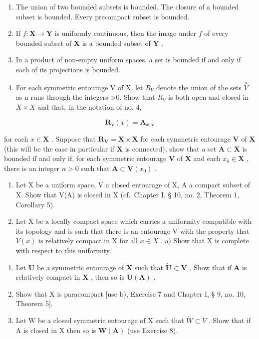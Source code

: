 \begin{enumerate}
\def\labelenumi{\alph{enumi})}
\item
  The union of two bounded subsets is bounded. The closure of a bounded subset is bounded. Every precompact subset is bounded.
\item
  If \(f: \mathbf{X} \to \mathbf{Y}\) is uniformly continuous, then the image under \(f\) of every bounded subset of \(\mathbf{X}\) is a bounded subset of \(\mathbf{Y}\) .
\item
  In a product of non-empty uniform spaces, a set is bounded if and only if each of its projections is bounded.
\item
  For each symmetric entourage V of X, let \(R_{V}\) denote the union of the sets \(\stackrel{n}{V}\) as n runs through the integers \textgreater0. Show that \(R_{V}\) is both open and closed in \(X \times X\) and that, in the notation of no. 4,
\end{enumerate}

\[
\mathbf {R} _ {\mathbf {v}} (x) = \mathbf {A} _ {x, \mathbf {v}}
\]

for each \(x \in \mathbf{X}\) . Suppose that \(\mathbf{R}_{\mathbf{V}} = \mathbf{X} \times \mathbf{X}\) for each symmetric entourage \(\mathbf{V}\) of \(\mathbf{X}\) (this will be the case in particular if \(\mathbf{X}\) is connected); show that a set \(\mathbf{A} \subset \mathbf{X}\) is bounded if and only if, for each symmetric entourage \(\mathbf{V}\) of \(\mathbf{X}\) and each \(x_0 \in \mathbf{X}\) , there is an integer \(n > 0\) such that \(\mathbf{A} \subset \mathbf{V}(x_0)\) .

\begin{enumerate}
\def\labelenumi{\arabic{enumi})}
\setcounter{enumi}{7}
\item
  Let X be a uniform space, V a closed entourage of X, A a compact subset of X. Show that V(A) is closed in X (cf.~Chapter I, § 10, no. 2, Theorem 1, Corollary 5).
\item
  Let X be a locally compact space which carries a uniformity compatible with its topology and is such that there is an entourage V with the property that \(V(x)\) is relatively compact in X for all \(x \in X\) . a) Show that X is complete with respect to this uniformity.
\end{enumerate}

\begin{enumerate}
\def\labelenumi{\alph{enumi})}
\setcounter{enumi}{1}
\item
  Let \(\mathbf{U}\) be a symmetric entourage of \(\mathbf{X}\) such that \(\dot{\mathbf{U}}\subset\mathbf{V}\) . Show that if \(\mathbf{A}\) is relatively compact in \(\mathbf{X}\) , then so is \(\mathbf{U}(\mathbf{A})\) .
\item
  Show that X is paracompact {[}use b), Exercise 7 and Chapter I, § 9, no. 10, Theorem 5{]}.
\item
  Let W be a closed symmetric entourage of X such that \(\dot{W} \subset V\) . Show that if A is closed in X then so is \(\mathbf{W}(\mathbf{A})\) (use Exercise 8).
\end{enumerate}


